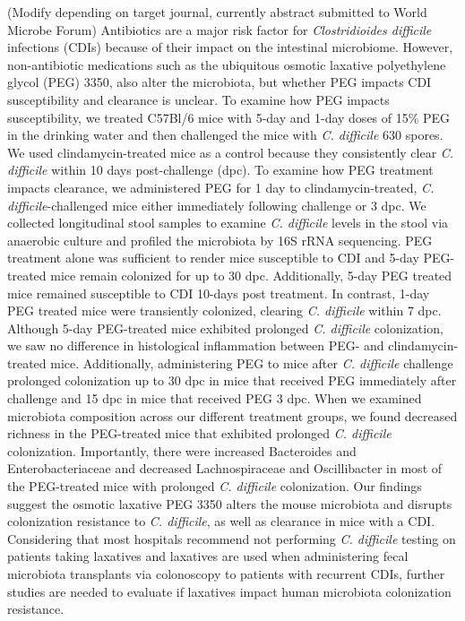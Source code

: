 \documentclass[
  11pt,
]{article}
\begin{document}
(Modify depending on target journal, currently abstract submitted to
World Microbe Forum) Antibiotics are a major risk factor for
\emph{Clostridioides difficile} infections (CDIs) because of their
impact on the intestinal microbiome. However, non-antibiotic medications
such as the ubiquitous osmotic laxative polyethylene glycol (PEG) 3350,
also alter the microbiota, but whether PEG impacts CDI susceptibility
and clearance is unclear. To examine how PEG impacts susceptibility, we
treated C57Bl/6 mice with 5-day and 1-day doses of 15\% PEG in the
drinking water and then challenged the mice with \emph{C. difficile} 630
spores. We used clindamycin-treated mice as a control because they
consistently clear \emph{C. difficile} within 10 days post-challenge
(dpc). To examine how PEG treatment impacts clearance, we administered
PEG for 1 day to clindamycin-treated, \emph{C. difficile}-challenged
mice either immediately following challenge or 3 dpc. We collected
longitudinal stool samples to examine \emph{C. difficile} levels in the
stool via anaerobic culture and profiled the microbiota by 16S rRNA
sequencing. PEG treatment alone was sufficient to render mice
susceptible to CDI and 5-day PEG-treated mice remain colonized for up to
30 dpc. Additionally, 5-day PEG treated mice remained susceptible to CDI
10-days post treatment. In contrast, 1-day PEG treated mice were
transiently colonized, clearing \emph{C. difficile} within 7 dpc.
Although 5-day PEG-treated mice exhibited prolonged \emph{C. difficile}
colonization, we saw no difference in histological inflammation between
PEG- and clindamycin-treated mice. Additionally, administering PEG to
mice after \emph{C. difficile} challenge prolonged colonization up to 30
dpc in mice that received PEG immediately after challenge and 15 dpc in
mice that received PEG 3 dpc. When we examined microbiota composition
across our different treatment groups, we found decreased richness in
the PEG-treated mice that exhibited prolonged \emph{C. difficile}
colonization. Importantly, there were increased Bacteroides and
Enterobacteriaceae and decreased Lachnospiraceae and Oscillibacter in
most of the PEG-treated mice with prolonged \emph{C. difficile}
colonization. Our findings suggest the osmotic laxative PEG 3350 alters
the mouse microbiota and disrupts colonization resistance to \emph{C.
difficile}, as well as clearance in mice with a CDI. Considering that
most hospitals recommend not performing \emph{C. difficile} testing on
patients taking laxatives and laxatives are used when administering
fecal microbiota transplants via colonoscopy to patients with recurrent
CDIs, further studies are needed to evaluate if laxatives impact human
microbiota colonization resistance.
\end{document}
